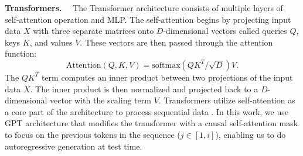 \noindent\textbf{Transformers.}~~
The Transformer \cite{4} architecture consists of multiple layers of self-attention operation and MLP. The self-attention begins by projecting input data $X$ with three separate matrices onto $D$-dimensional vectors called queries $Q$, keys $K$, and values $V$. These vectors are then passed through the attention function:
\begin{equation}
    \mathrm{Attention}(Q,K,V)=\mathrm{softmax}(QK^T/\sqrt{D})V.
\label{self-attention}
\end{equation}
The $QK^T$ term computes an inner product between two projections of the input data $X$. The inner product is then normalized and projected back to a $D$-dimensional vector with the scaling term $V$. Transformers utilize self-attention as a core part of the architecture to process sequential data \cite{22,21}. In this work, we use GPT \cite{23} architecture that modifies the transformer with a causal self-attention mask to focus on the previous tokens in the sequence ($j\in[1,i]$), enabling us to do autoregressive generation at test time.